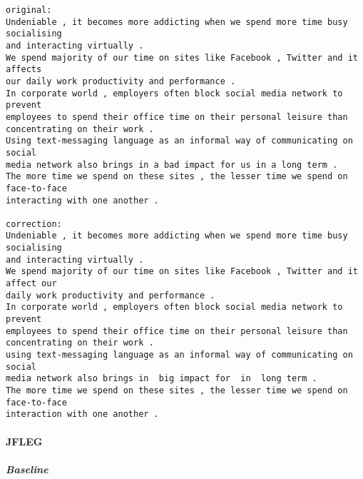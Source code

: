 \documentclass[10pt]{article}
\begin{document}
    \begin{Verbatim}[commandchars=\\\{\}]
original:
Undeniable , it becomes more addicting when we spend more time busy socialising
and interacting virtually .
We spend majority of our time on sites like Facebook , Twitter and it affects
our daily work productivity and performance .
In corporate world , employers often block social media network to prevent
employees to spend their office time on their personal leisure than
concentrating on their work .
Using text-messaging language as an informal way of communicating on social
media network also brings in a bad impact for us in a long term .
The more time we spend on these sites , the lesser time we spend on face-to-face
interacting with one another .

correction:
Undeniable , it becomes more addicting when we spend more time busy socialising
and interacting virtually .
We spend majority of our time on sites like Facebook , Twitter and it affect our
daily work productivity and performance .
In corporate world , employers often block social media network to prevent
employees to spend their office time on their personal leisure than
concentrating on their work .
using text-messaging language as an informal way of communicating on social
media network also brings in  big impact for  in  long term .
The more time we spend on these sites , the lesser time we spend on face-to-face
interaction with one another .
    \end{Verbatim}

    \hypertarget{jfleg}{%
\paragraph{JFLEG}\label{jfleg}}

    \hypertarget{baseline}{%
\subparagraph{Baseline}\label{baseline}}
\end{document}
